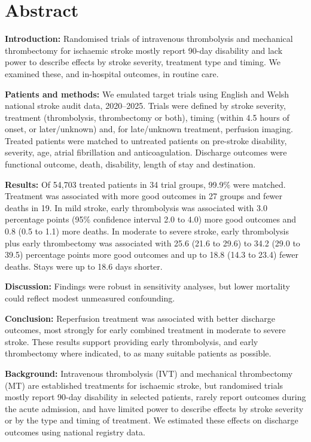 \section*{Abstract}

\ifshortabstract

\textbf{Introduction:} Randomised trials of intravenous thrombolysis and mechanical thrombectomy for ischaemic stroke mostly report 90-day disability and lack power to describe effects by stroke severity, treatment type and timing. We examined these, and in-hospital outcomes, in routine care.

\textbf{Patients and methods:} We emulated target trials using English and Welsh national stroke audit data, 2020--2025. Trials were defined by stroke severity, treatment (thrombolysis, thrombectomy or both), timing (within 4.5 hours of onset, or later/unknown) and, for late/unknown treatment, perfusion imaging. Treated patients were matched to untreated patients on pre-stroke disability, severity, age, atrial fibrillation and anticoagulation. Discharge outcomes were functional outcome, death, disability, length of stay and destination.

\textbf{Results:} Of 54,703 treated patients in 34 trial groups, 99.9\% were matched. Treatment was associated with more good outcomes in 27 groups and fewer deaths in 19. In mild stroke, early thrombolysis was associated with 3.0 percentage points (95\% confidence interval 2.0 to 4.0) more good outcomes and 0.8 (0.5 to 1.1) more deaths. In moderate to severe stroke, early thrombolysis plus early thrombectomy was associated with 25.6 (21.6 to 29.6) to 34.2 (29.0 to 39.5) percentage points more good outcomes and up to 18.8 (14.3 to 23.4) fewer deaths. Stays were up to 18.6 days shorter.

\textbf{Discussion:} Findings were robust in sensitivity analyses, but lower mortality could reflect modest unmeasured confounding.

\textbf{Conclusion:} Reperfusion treatment was associated with better discharge outcomes, most strongly for early combined treatment in moderate to severe stroke. These results support providing early thrombolysis, and early thrombectomy where indicated, to as many suitable patients as possible.

\else

\textbf{Background:} Intravenous thrombolysis (IVT) and mechanical thrombectomy (MT) are established treatments for ischaemic stroke, but randomised trials mostly report 90-day disability in selected patients, rarely report outcomes during the acute admission, and have limited power to describe effects by stroke severity or by the type and timing of treatment. We estimated these effects on discharge outcomes using national registry data.


